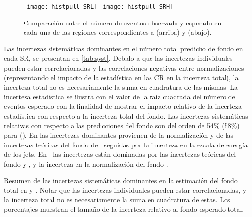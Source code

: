 \begin{figure}[!htbp]
  \centering

  \texttt{[image: histpull\_SRL]}
  \texttt{[image: histpull\_SRH]}

  \caption{Comparación entre el número de eventos observado y esperado en cada
    una de las regiones correspondientes a {\SRL} (arriba) y {\SRH} (abajo).}

  \label{fig:fit_region_composition}

\end{figure}


Las incertezas sistemáticas dominantes en el número total predicho de fondo en
cada SR, se presentan en \cref{tab:syst}.
Debido a que las incertezas individuales pueden estar correlacionadas y las
correlaciones negativas entre normalizaciones (representando el impacto de la
estadística en las CR en la incerteza total), la incerteza total no es
necesariamente la suma en cuadratura de las mismas. La incerteza estadística se
ilustra con el valor de la raíz cuadrada del número de eventos esperado con la
finalidad de mostrar el impacto relativo de la incerteza estadística con
respecto a la incerteza total del fondo. Las incertezas sistemáticas relativas
con respecto a las predicciones del fondo son del orden de 54\% (58\%) para
{\SRL} (\SRH). En {\SRL} las incertezas dominantes provienen de la normalización
y de las incertezas teóricas del fondo de {\ttgam}, seguidas por la incerteza en
la escala de energía de los jets. En {\SRH}, las
incertezas están dominadas por las incertezas teóricas del fondo {\zgam} y
{\gjet}, y la incerteza en la normalización del fondo {\wgam}.


\begin{table}[!htbp]
  \centering

  \caption{Resumen de las incertezas sistemáticas dominantes en la estimación del fondo total
    en {\SRL} y {\SRH}. Notar que las incertezas individuales pueden estar correlacionadas, y la incerteza
    total no es necesariamente la suma en cuadratura de estas. Los porcentajes muestran el tamaño
    de la incerteza relativo al fondo esperado total.}
  \label{tab:syst}

  
\end{table}



